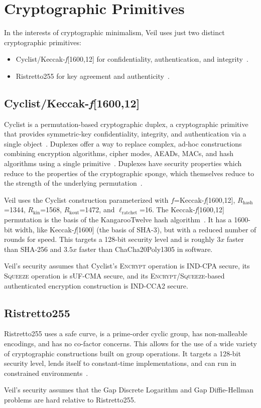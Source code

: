 \section{Cryptographic Primitives}\label{sec:cryptographic-primitives}

In the interests of cryptographic minimalism, Veil uses just two distinct cryptographic primitives:

\begin{itemize}
    \item Cyclist/Keccak-\emph{f}[1600,12] for confidentiality, authentication, and
    integrity~\cite{daemen2020,bertoni2018}.
    \item Ristretto255 for key agreement and authenticity~\cite{deValence2020}.
\end{itemize}

\subsection{Cyclist/Keccak-\emph{f}[1600,12]}\label{subsec:cyclist}

Cyclist is a permutation-based cryptographic duplex, a cryptographic primitive that provides symmetric-key
confidentiality, integrity, and authentication via a single object~\cite{daemen2020}.
Duplexes offer a way to replace complex, ad-hoc constructions combining encryption algorithms, cipher modes,
AEADs, MACs, and hash algorithms using a single primitive~\cite{daemen2020, bertoni2011duplex}.
Duplexes have security properties which reduce to the properties of the cryptographic sponge, which themselves reduce to
the strength of the underlying permutation~\cite{bertoni2008}.

Veil uses the Cyclist construction parameterized with $f$=Keccak-\emph{f}[1600,12], $R_\text{hash}$=1344,
$R_\text{kin}$=1568, $R_\text{kout}$=1472, and $\ell_\text{ratchet}$=16.
The Keccak-\emph{f}[1600,12] permutation is the basis of the KangarooTwelve hash algorithm~\cite{bertoni2018}.
It has a 1600-bit width, like Keccak-\emph{f}[1600] (the basis of SHA-3), but with a reduced number of rounds for speed.
This targets a 128-bit security level and is roughly $3x$ faster than SHA-256 and $3.5x$ faster than ChaCha20Poly1305 in
software.

Veil's security assumes that Cyclist's \textsc{Encrypt} operation is IND-CPA secure, its
\textsc{Squeeze} operation is sUF-CMA secure, and its
\textsc{Encrypt}/\textsc{Squeeze}-based authenticated encryption construction is IND-CCA2 secure.

\subsection{Ristretto255}\label{subsec:ristretto255}

Ristretto255 uses a safe curve, is a prime-order cyclic group, has non-malleable encodings, and has no
co-factor concerns.
This allows for the use of a wide variety of cryptographic constructions built on group operations.
It targets a 128-bit security level, lends itself to constant-time implementations, and can run in constrained
environments~\cite{deValence2018}.

Veil's security assumes that the Gap Discrete Logarithm and Gap Diffie-Hellman problems are hard relative to
Ristretto255.
